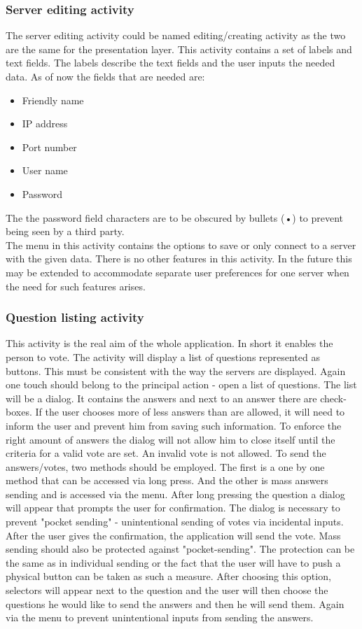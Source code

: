 \documentclass[11pt]{article} %
\begin{document}
\subsubsection{Server editing activity}
The server editing activity could be named editing/creating activity as the two are the same for the presentation layer. This activity contains a set of labels and text fields. The labels describe the text fields and the user inputs the needed data. As of now the fields that are needed are:
\begin{itemize}
\item Friendly name
\item IP address
\item Port number
\item User name
\item Password
\end{itemize}
The the password field characters are to be obscured by bullets (•) to prevent being seen by a third party.\\
The menu in this activity contains the options to save or only connect to a server with the given data. There is no other features in this activity. In the future this may be extended to accommodate separate user preferences for one server when the need for such features arises.  

\subsubsection{Question listing activity}
This activity is the real aim of the whole application. In short it enables the person to vote. The activity will display a list of questions represented as buttons. This must be consistent with the way the servers are displayed. Again one touch should belong to  the principal action - open a list of questions. The list will be a dialog. It contains the answers and next to an answer there are check-boxes. If the user chooses more of less answers than are allowed, it will need to inform the user and prevent him from saving such information. To enforce the right amount of answers the dialog will not allow him to close itself until the criteria for a valid vote are set. An invalid vote is not allowed. To send the answers/votes, two methods should be employed. The first is a one by one method that can be accessed via long press. And the other is mass answers sending and is accessed via the menu. After long pressing the question a dialog will appear that prompts the user for confirmation. The dialog is necessary to prevent "pocket sending" - unintentional sending of votes via incidental inputs. After the user gives the confirmation, the application will send the vote. Mass sending should also be protected against "pocket-sending". The protection can be the same as in individual sending or the fact that the user will have to push a physical button can be taken as such a measure. After choosing this option, selectors will appear next to the question and the user will then choose the questions he would like to send the answers and then he will send them. Again via the menu to prevent unintentional inputs from sending the answers.
\end{document}
